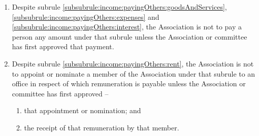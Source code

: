 \begin{enumerate}
	\item Despite subrule \ref{subsubrule:income:payingOthers:goodsAndServices}, \ref{subsubrule:income:payingOthers:expenses} and \ref{subsubrule:income:payingOthers:interest}, the Association is not to pay a person any amount under that subrule unless the Association or committee has first approved that payment.

	\item Despite subrule \ref{subsubrule:income:payingOthers:rent}, the Association is not to appoint or nominate a member of the Association under that subrule to an office in respect of which remuneration is payable unless the Association or committee has first approved --
	\begin{enumerate}
		\item that appointment or nomination; and
		\item the receipt of that remuneration by that member.
	\end{enumerate}

\end{enumerate}